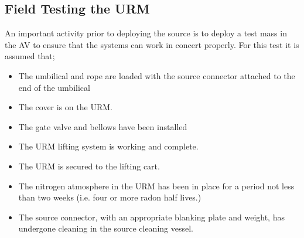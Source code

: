 \documentclass[11pt]{article}
\begin{document}
\subsection{Field Testing the URM}\label{ss:Testing}
An important activity prior to deploying the source is to deploy a test mass in the AV to ensure that the systems can work in concert properly. For this test it is assumed that;
\begin{itemize}[label={$\square$}]
\item The umbilical and rope are loaded with the source connector attached to the end of the umbilical
\item The cover is on the URM.
\item The gate valve and bellows have been installed
\item The URM lifting system is working and complete.
\item The URM is secured to the lifting cart. 
\item The nitrogen atmosphere in the URM has been in place for a period not less than two weeks (i.e. four or more radon half lives.)
\item The source connector, with an appropriate blanking plate and weight, has undergone cleaning in the source cleaning vessel.
\end{itemize}
\end{document}
